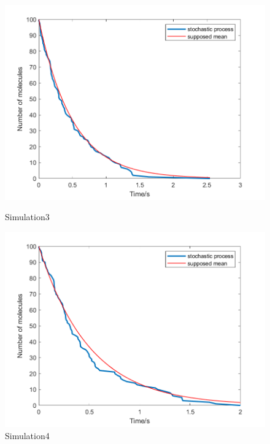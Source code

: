 \documentclass{article}
\begin{document}
\begin{figure}[htbp]
    \centering
    \begin{minipage}{0.45\linewidth}
        \centering
        \includegraphics[width=\linewidth]{graph/b3.png}
        \caption{Simulation3}
        \label{b3}
    \end{minipage}
    \hfill
    \begin{minipage}{0.45\linewidth}
        \centering
        \includegraphics[width=\linewidth]{graph/b4.png}
        \caption{Simulation4}
        \label{b4}
    \end{minipage}
\end{figure}
\end{document}
